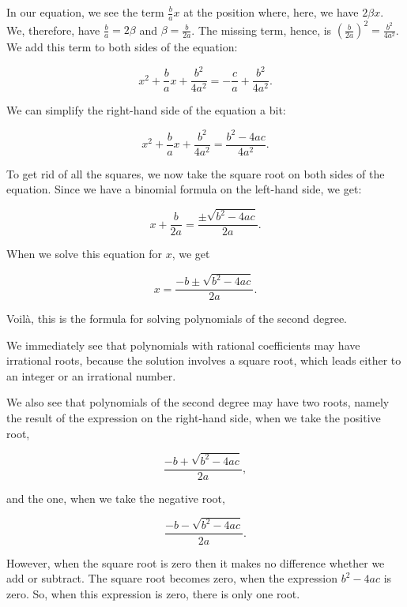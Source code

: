 \documentclass[tikz]{scrreprt}
\begin{document}
In our equation, we see the term $\frac{b}{a}x$ at the position
where, here, we have $2\beta x$.
We, therefore, have $\frac{b}{a} = 2\beta$ 
and $\beta = \frac{b}{2a}$.
The missing term, hence, is 
$(\frac{b}{2a})^2 = \frac{b^2}{4a^2}$.
We add this term to both sides of the equation:

\begin{equation}
x^2 + \frac{b}{a}x + \frac{b^2}{4a^2} = -\frac{c}{a} + \frac{b^2}{4a^2}.
\end{equation}

We can simplify the right-hand side of the equation a bit:

\begin{equation}
x^2 + \frac{b}{a}x + \frac{b^2}{4a^2} = \frac{b^2-4ac}{4a^2}.
\end{equation}

To get rid of all the squares, we now take the square root
on both sides of the equation. Since we have a binomial
formula on the left-hand side, we get:

\begin{equation}
x + \frac{b}{2a} = \frac{\pm\sqrt{b^2-4ac}}{2a}.
\end{equation}

When we solve this equation for $x$, we get

\begin{equation}
x = \frac{-b \pm\sqrt{b^2-4ac}}{2a}.
\end{equation}

Voilà, this is the formula for solving polynomials of
the second degree.

We immediately see that polynomials with rational coefficients
may have irrational roots, because the solution involves
a square root, which leads either to an integer or
an irrational number.

We also see that polynomials of the second degree
may have two roots, namely the result of the expression
on the right-hand side, when we take the positive root,
\ie\ 

\[
\frac{-b+\sqrt{b^2-4ac}}{2a},
\]

and the one, when we take the negative root, \ie

\[
\frac{-b-\sqrt{b^2-4ac}}{2a}.
\]

However, when the square root is zero
then it makes no difference whether we add
or subtract. The square root becomes zero, when
the expression
$b^2-4ac$ is zero. So, when this expression
is zero, there is only one root.
\end{document}
